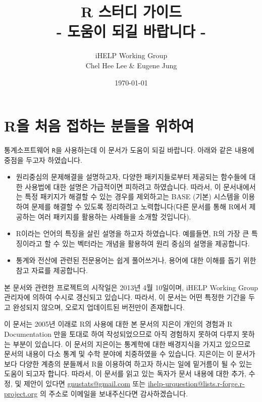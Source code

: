 \documentclass{book}
\title{R 스터디 가이드 \\
   - 도움이 되길 바랍니다 - 
   }
\author{iHELP Working Group \\ Chel Hee Lee \& Eugene Jung }
\date{\today}
\begin{document}
\maketitle

%
%
%
%

\part{R을 처음 접하는 분들을 위하여}


통계소프트웨어 \texttt{R}을 사용하는데 이 문서가 도움이 되길 바랍니다. 
아래와 같은 내용에 중점을 두고자 하였습니다. 

\begin{itemize}
\item 원리중심의 문제해결을 설명하고자, 다양한 패키지들로부터 제공되는 함수들에 대한 사용법에 대한 설명은 가급적이면 피하려고 하였습니다.
따라서, 이 문서내에서는 특정 패키지가 해결할 수 있는 경우를 제외하고는 BASE (기본) 시스템을 이용하여 문제를 해결할 수 있도록 정리하려고 노력합니다(다른 문서를 통해 R에서 제공하는 여러 패키지를 활용하는 사례들을 소개할 것입니다).

\item R이라는 언어의 특징을 살린 설명을 하고자 하였습니다.  
예를들면, R의 가장 큰 특징이라고 할 수 있는 벡터라는 개념을 활용하여 원리 중심의 설명을 제공합니다. 

\item 통계와 전산에 관련된 전문용어는 쉽게 풀어쓰거나, 용어에 대한 이해를 돕기 위한 참고 자료를 제공합니다. 
\end{itemize}

본 문서와 관련한 프로젝트의 시작일은 2013년 4월 10일이며, iHELP Working Group 관리자에 의하여 수시로 갱신되고 있습니다.
따라서, 이 문서는 어떤 특정한 기간을 두고 완성되지 않으며, 오로지 업데이트된 버전만이 존재합니다.

이 문서는 2005년 이래로 R의 사용에 대한 본 문서의 지은이 개인의 경험과 R Documentation 만을 토대로 하여 작성되었으므로 아직 경험하지 못하여 다루지 못하는 부분이 있습니다.
이 문서의 지은이는 통계학에 대한 
배경지식을 가지고 있으므로 문서의 내용이 다소 통계 및 수학 분야에 치중하였을 수 있습니다.
지은이는 이 문서가 보다 다양한 계층의 분들께서 R을 이용하여 하고자 하시는 일에 밑거름이 될 수 있는 도움이 되고자 합니다.
따라서, 이 문서를 읽고 있는 독자가 문서 내용에 대한 추가, 수정, 및 제안이 있다면 \href{mailto:gnustats@gmail.com}{gnustats@gmail.com} 또는 \href{mailto:ihelp-urquestion@lists.r-forge.r-project.org}{ihelp-urquestion@lists.r-forge.r-project.org} 의 주소로 이메일을 보내주신다면 감사하겠습니다. 
\end{document}
